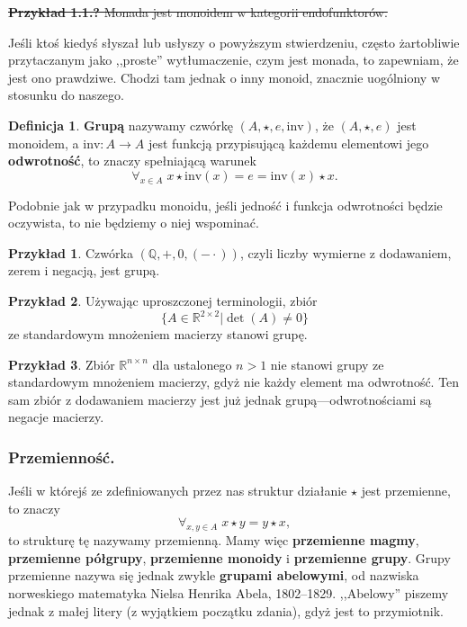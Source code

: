 \documentclass{book}
\theoremstyle{definition}
\newtheorem{definition}{Definicja}[section]
\newtheorem{example}{Przykład}[section]
\begin{document}
\noindent\sout{
	\textbf{Przykład 1.1.?} Monada jest monoidem w kategorii endofunktorów.
}

Jeśli ktoś kiedyś słyszał lub usłyszy o powyższym stwierdzeniu,
	często żartobliwie przytaczanym jako ,,proste'' wytłumaczenie,
	czym jest monada, to zapewniam, że jest ono prawdziwe.
Chodzi tam jednak o inny monoid,
	znacznie uogólniony w stosunku do naszego.

\begin{definition}
    \textbf{Grupą} nazywamy czwórkę $(A, \star, e, \mathrm{inv})$,
		że $(A, \star, e)$ jest monoidem,
		a $\mathrm{inv}: A \to A$ jest funkcją przypisującą każdemu elementowi jego \textbf{odwrotność},
		to znaczy spełniającą warunek
	\begin{equation*}
		\forall_{x \in A}\; {x\star \mathrm{inv}(x) = e = \mathrm{inv}(x) \star x}.
	\end{equation*}
\end{definition}
Podobnie jak w przypadku monoidu,
	jeśli jedność i funkcja odwrotności będzie oczywista,
	to nie będziemy o niej wspominać.

\begin{example}
	Czwórka $(\mathbb{Q}, +, 0, (-\cdot))$, czyli liczby wymierne z dodawaniem, zerem i negacją, jest grupą.
\end{example}

\begin{example}
	Używając uproszczonej terminologii, zbiór
	\begin{equation}
		\{A \in \mathbb{R}^{2 \times 2} | \det(A) \neq 0 \}
	\end{equation}
		ze standardowym mnożeniem macierzy stanowi grupę.
\end{example}

\begin{example}
	Zbiór $\mathbb{R}^{n \times n}$ dla ustalonego $n > 1$ nie stanowi grupy
		ze standardowym mnożeniem macierzy,
		gdyż nie każdy element ma odwrotność.
	Ten sam zbiór z dodawaniem macierzy jest już jednak grupą---odwrotnościami są negacje macierzy.
\end{example}

\subsubsection{Przemienność.}
Jeśli w którejś ze zdefiniowanych przez nas struktur działanie $\star$ jest przemienne, to znaczy
\begin{equation}
	\forall_{x,y \in A}\; x \star y = y \star x,
\end{equation}
to strukturę tę nazywamy przemienną.
Mamy więc \textbf{przemienne magmy}, \textbf{przemienne półgrupy}, \textbf{przemienne monoidy} i \textbf{przemienne grupy}.
Grupy przemienne nazywa się jednak zwykle \textbf{grupami abelowymi},
od nazwiska norweskiego matematyka Nielsa Henrika Abela, 1802--1829.
,,Abelowy'' piszemy jednak z małej litery (z wyjątkiem początku zdania), gdyż jest to przymiotnik.
\end{document}
